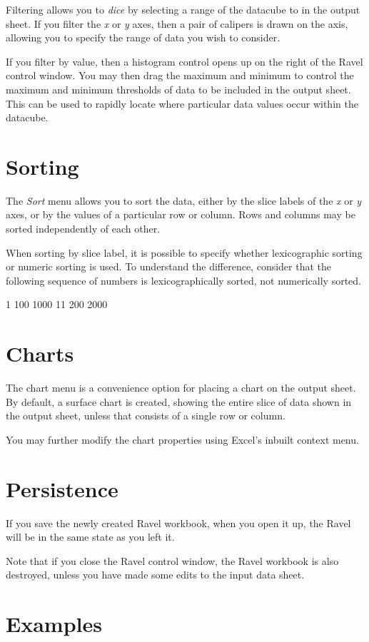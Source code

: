 \documentclass{article}
\begin{document}
Filtering allows you to {\em dice} by selecting a range of the
datacube to in the output sheet. If you filter the {\em x} or {\em y} axes,
then a pair of calipers is drawn on the axis, allowing you to specify
the range of data you wish to consider.

If you filter by value, then a histogram control opens up on the right
of the Ravel control window. You may then drag the maximum and minimum
to control the maximum and minimum thresholds of data to be included
in the output sheet. This can be used to rapidly locate where
particular data values occur within the datacube.

\section{Sorting}

The {\em Sort} menu allows you to sort the data, either by the
slice labels of the {\em x} or {\em y} axes, or by the values of a particular
row or column. Rows and columns may be sorted independently of each
other.

When sorting by slice label, it is possible to specify whether
lexicographic sorting or numeric sorting is used. To understand the
difference, consider that the following sequence of numbers is
lexicographically sorted, not numerically sorted.

1 100 1000 11 200 2000

\section{Charts}

The chart menu is a convenience option for placing a chart on the
output sheet. By default, a surface chart is created, showing the
entire slice of data shown in the output sheet, unless that consists
of a single row or column.

You may further modify the chart properties using Excel's inbuilt
context menu.

\section{Persistence}

If you save the newly created Ravel workbook, when you open it up, the
Ravel will be in the same state as you left it.

Note that if you close the Ravel control window, the Ravel workbook is
also destroyed, unless you have made some edits to the input data sheet.

\section{Examples}

\\
\\
\end{document}
